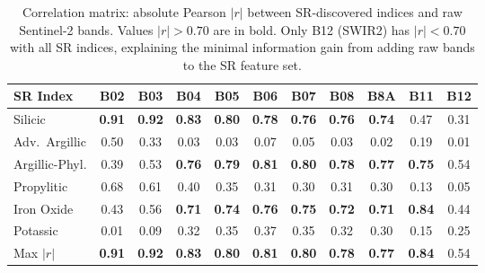 \documentclass[review,authoryear]{elsarticle}
\begin{document}
\begin{table}[ht]
\centering
\caption{Correlation matrix: absolute Pearson $|r|$ between SR-discovered indices and raw Sentinel-2 bands. Values $|r| > 0.70$ are in bold. Only B12 (SWIR2) has $|r| < 0.70$ with all SR indices, explaining the minimal information gain from adding raw bands to the SR feature set.}
\label{tab:s_correlation}
\begin{tabular}{lcccccccccc}
\toprule
SR Index & B02 & B03 & B04 & B05 & B06 & B07 & B08 & B8A & B11 & B12 \\
\midrule
Silicic       & \textbf{0.91} & \textbf{0.92} & \textbf{0.83} & \textbf{0.80} & \textbf{0.78} & \textbf{0.76} & \textbf{0.76} & \textbf{0.74} & 0.47 & 0.31 \\
Adv.\ Argillic& 0.50 & 0.33 & 0.03 & 0.03 & 0.07 & 0.05 & 0.03 & 0.02 & 0.19 & 0.01 \\
Argillic-Phyl.& 0.39 & 0.53 & \textbf{0.76} & \textbf{0.79} & \textbf{0.81} & \textbf{0.80} & \textbf{0.78} & \textbf{0.77} & \textbf{0.75} & 0.54 \\
Propylitic    & 0.68 & 0.61 & 0.40 & 0.35 & 0.31 & 0.30 & 0.31 & 0.30 & 0.13 & 0.05 \\
Iron Oxide    & 0.43 & 0.56 & \textbf{0.71} & \textbf{0.74} & \textbf{0.76} & \textbf{0.75} & \textbf{0.72} & \textbf{0.71} & \textbf{0.84} & 0.44 \\
Potassic      & 0.01 & 0.09 & 0.32 & 0.35 & 0.37 & 0.35 & 0.32 & 0.30 & 0.15 & 0.25 \\
\midrule
Max $|r|$     & \textbf{0.91} & \textbf{0.92} & \textbf{0.83} & \textbf{0.80} & \textbf{0.81} & \textbf{0.80} & \textbf{0.78} & \textbf{0.77} & \textbf{0.84} & 0.54 \\
\bottomrule
\end{tabular}
\end{table}
\end{document}
